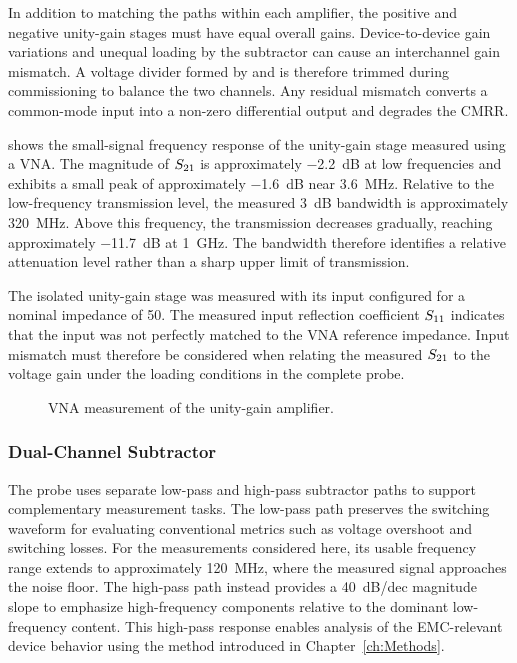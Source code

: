 In addition to matching the paths within each amplifier, the positive and negative unity-gain stages must have equal overall gains.
Device-to-device gain variations and unequal loading by the subtractor can cause an interchannel gain mismatch.
A voltage divider formed by  and  is therefore trimmed during commissioning to balance the two channels.
Any residual mismatch converts a common-mode input into a non-zero differential output and degrades the CMRR.

 shows the small-signal frequency response of the unity-gain stage measured using a VNA.
The magnitude of ${S}_{\mathrm{21}}$ is approximately \SI{-2.2}{dB} at low frequencies and exhibits a small peak of approximately \SI{-1.6}{dB} near \SI{3.6}{MHz}.
Relative to the low-frequency transmission level, the measured \SI{3}{dB} bandwidth is approximately \SI{320}{MHz}.
Above this frequency, the transmission decreases gradually, reaching approximately \SI{-11.7}{dB} at \SI{1}{GHz}.
The bandwidth therefore identifies a relative attenuation level rather than a sharp upper limit of transmission.

The isolated unity-gain stage was measured with its input configured for a nominal impedance of \SI{50}{\Omega}.
The measured input reflection coefficient ${S}_{\mathrm{11}}$ indicates that the input was not perfectly matched to the VNA reference impedance.
Input mismatch must therefore be considered when relating the measured ${S}_{\mathrm{21}}$ to the voltage gain under the loading conditions in the complete probe.


\begin{figure}[ht]
	\centering
	
	\caption{VNA measurement of the unity-gain amplifier.}\label{fig:VNA_rawUG}
\end{figure}












\subsubsection*{Dual-Channel Subtractor}
The probe uses separate low-pass and high-pass subtractor paths to support complementary measurement tasks.
The low-pass path preserves the switching waveform for evaluating conventional metrics such as voltage overshoot and switching losses.
For the measurements considered here, its usable frequency range extends to approximately \SI{120}{MHz}, where the measured signal approaches the noise floor.
The high-pass path instead provides a \SI{+40}{dB/dec} magnitude slope to emphasize high-frequency components relative to the dominant low-frequency content.
This high-pass response enables analysis of the EMC-relevant device behavior using the method introduced in Chapter~\ref{ch:Methods}.


